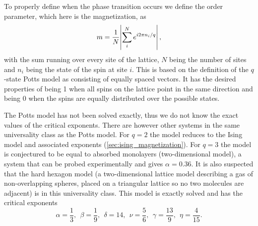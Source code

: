 \documentclass[11pt, a4paper]{report} %
\begin{document}
To properly define when the phase transition occurs we define the order parameter, which here is the magnetization, as
\begin{equation}
	m = \frac{1}{N}\abs{\sum_i^N e^{i2\pi n_i / q}},
\end{equation}
with the sum running over every site of the lattice, \(N\) being the number of sites and \(n_i\) being the state of the spin at site \(i\).
This is based on the definition of the \(q\)-state Potts model as consisting of equally spaced vectors.
It has the desired properties of being 1 when all spins on the lattice point in the same direction and being 0 when the spins are equally distributed over the possible states.

The Potts model has not been solved exactly, thus we do not know the exact values of the critical exponents.
There are however other systems in the same universality class as the Potts model.
For \(q=2\) the model reduces to the Ising model and associated exponents (\cref{sec:ising_magnetization}).
For \(q=3\) the model is conjectured to be equal to absorbed monolayers (two-dimensional model), a system that can be probed experimentally and gives \(\alpha = 0.36\)\cite{binder:1981a}.
It is also suspected that the hard hexagon model (a two-dimensional lattice model describing a gas of non-overlapping spheres, placed on a triangular lattice so no two molecules are adjacent) is in this universality class.
This model is exactly solved and has the critical exponents\cite{baxter:1989,wu:1982}
\begin{equation} \label{eq:potts_critical_exponents}
	\alpha = \frac{1}{3},\ \ \beta = \frac{1}{9},\ \ \delta = 14,\ \ \nu = \frac{5}{6},\ \ \gamma = \frac{13}{9},\ \ \eta = \frac{4}{15}.
\end{equation}
\end{document}
